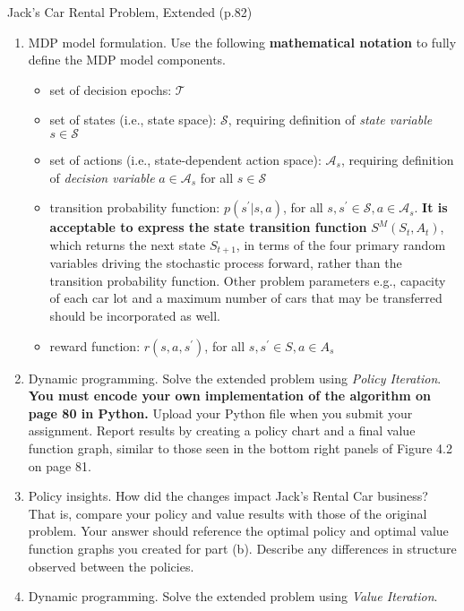 \documentclass[12pt,letterpaper]{exam}
\begin{document}
\begin{questions}
	\setcounter{question}{6}
	\question%
	Jack's Car Rental Problem, Extended (p.82)
	\begin{enumerate}[label= (\alph*)]
		\item 
		MDP model formulation. 
		Use the following \textbf{mathematical notation} to fully define the MDP model components.
		\begin{itemize}
			\item set of decision epochs: \(\mathcal{T}\)
			\item set of states (i.e., state space): \(\mathcal{S}\), 
			requiring definition of \emph{state variable} \(s \in \mathcal{S}\)
			\item set of actions (i.e., state-dependent action space): \(\mathcal{A}_s\), 
			requiring definition of \emph{decision variable} \(a\in\mathcal{A}_s\) for all \(s\in\mathcal{S}\)
			\item transition probability function: \(p(s^\prime|s, a)\), 
			for all \(s, s^\prime \in \mathcal{S}, a \in \mathcal{A}_s\). 
			\textbf{It is acceptable to express the state transition function} \(S^M(S_t, A_t)\), 
			which returns the next state \(S_{t+1}\), in terms of the four primary random variables driving the stochastic process forward, 
			rather than the transition probability function. Other problem parameters \- e.g., capacity of each car lot
			and a maximum number of cars that may be transferred \- should be incorporated as well.
			\item reward function: \(r(s, a, s^\prime)\), for all \(s, s^\prime \in S, a \in A_s\)
		\end{itemize}
		\item 
		Dynamic programming. Solve the extended problem using \emph{Policy Iteration}. 
		\textbf{You must encode your own implementation of the algorithm on page 80 in Python.} 
		Upload your Python file when you submit your assignment. 
		Report results by creating a policy chart and a final value function graph, 
		similar to those seen in the bottom right panels of Figure 4.2 on page 81.
		\item 
		Policy insights. How did the changes impact Jack's Rental Car business? That is, compare
		your policy and value results with those of the original problem. Your answer should reference
		the optimal policy and optimal value function graphs you created for part (b). Describe any
		differences in structure observed between the policies.
		\item 
		Dynamic programming. Solve the extended problem using \emph{Value Iteration}. 

\end{enumerate}
\end{questions}
\end{document}

